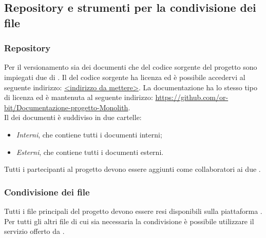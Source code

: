 \subsection{Repository e strumenti per la condivisione dei file}

\subsubsection{Repository}
Per il versionamento sia dei documenti che del codice sorgente del progetto sono impiegati due  di . Il  del codice sorgente ha licenza  ed è possibile accedervi al seguente indirizzo: \url{<indirizzo da mettere>}.
La documentazione ha lo stesso tipo di licenza ed è mantenuta al seguente indirizzo: \url{https://github.com/or-bit/Documentazione-progetto-Monolith}.\\
Il  dei documenti è suddiviso in due cartelle: 
\begin{itemize}
	\item \textit{Interni}, che contiene tutti i documenti interni;
	\item \textit{Esterni}, che contiene tutti i documenti esterni.
\end{itemize}
Tutti i partecipanti al progetto devono essere aggiunti come collaboratori ai due .

\subsubsection{Condivisione dei file}
Tutti i file principali del progetto devono essere resi disponibili sulla piattaforma . Per tutti gli altri file di cui sia necessaria la condivisione è possibile utilizzare il servizio offerto da .

